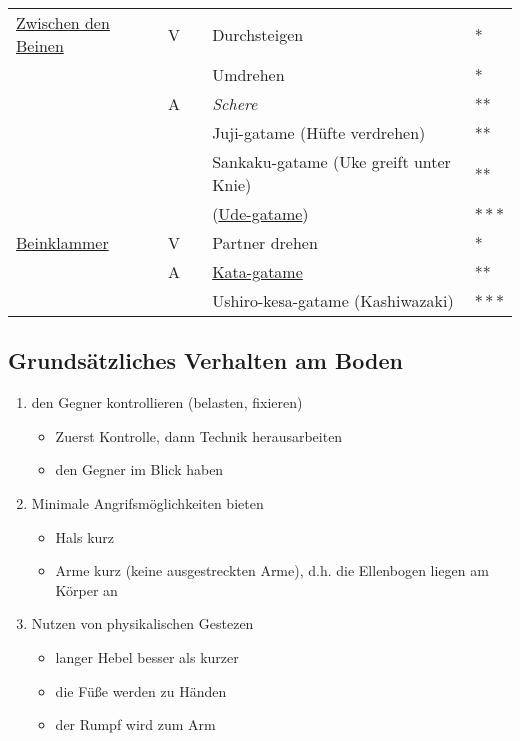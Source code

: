 \documentclass[justified, a4paper, notitlepage, captions=tableheading, nobib]{tufte-handout}
\begin{document}
\begin{center}
\begin{tabular}{lllll}
\hline
\hyperref[orgf285c69]{Zwischen den Beinen} & V &  & Durchsteigen & *\\
 &  &  & Umdrehen & *\\
 & A &  & \emph{Schere} & **\\
 &  &  & Juji-gatame (Hüfte verdrehen) & **\\
 &  &  & Sankaku-gatame (Uke greift unter Knie) & **\\
 &  &  & (\hyperref[org042d788]{Ude-gatame}) & \(\ast \ast \ast\)\\
\hline
\hyperref[org36bef7c]{Beinklammer} & V &  & Partner drehen & *\\
 & A &  & \hyperref[orga0a7671]{Kata-gatame} & **\\
 &  &  & Ushiro-kesa-gatame (Kashiwazaki) & \(\ast \ast \ast\)\\
\end{tabular}
\end{center}

\newpage
\subsection{Grundsätzliches Verhalten am Boden}
\label{sec:org0f49d80}
\begin{enumerate}
\item den Gegner kontrollieren (belasten, fixieren) 
\begin{itemize}
\item Zuerst Kontrolle, dann Technik herausarbeiten
\item den Gegner im Blick haben
\end{itemize}
\item Minimale Angrifsmöglichkeiten bieten
\begin{itemize}
\item Hals kurz
\item Arme kurz (keine ausgestreckten Arme), d.h. die Ellenbogen liegen am Körper an
\end{itemize}
\item Nutzen von physikalischen Gestezen
\begin{itemize}
\item langer Hebel besser als kurzer
\item die Füße werden zu Händen
\item der Rumpf wird zum Arm
\end{itemize}
\end{enumerate}
\end{document}
